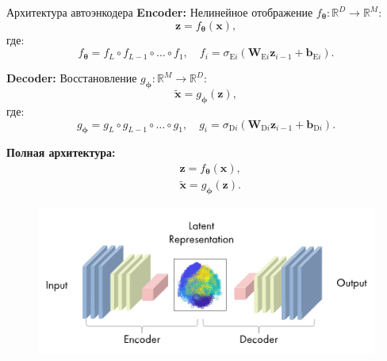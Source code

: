 \begin{frame}[allowframebreaks]{Архитектура автоэнкодера}
    \textbf{Encoder:} Нелинейное отображение $f_{\boldsymbol{\theta}}: \mathbb{R}^D \to \mathbb{R}^M$:
    \begin{equation*}
        \boldsymbol{z} = f_{\boldsymbol{\theta}}(\boldsymbol{x}),
    \end{equation*}
    где:
    \begin{equation*}
        f_{\boldsymbol{\theta}} = f_L \circ f_{L-1} \circ \ldots \circ f_1, \quad f_i = \sigma_{\text{E}i}(\mathbf{W}_{\text{E}i}\boldsymbol{z}_{i-1} + \boldsymbol{b}_{\text{E}i}).
    \end{equation*}

    \textbf{Decoder:} Восстановление $g_{\boldsymbol{\phi}}: \mathbb{R}^M \to \mathbb{R}^D$:
    \begin{equation*}
        \tilde{\boldsymbol{x}} = g_{\boldsymbol{\phi}}(\boldsymbol{z}),
    \end{equation*}
    где:
    \begin{equation*}
        g_{\boldsymbol{\phi}} = g_L \circ g_{L-1} \circ \ldots \circ g_1, \quad g_i = \sigma_{\text{D}i}(\mathbf{W}_{\text{D}i}\boldsymbol{z}_{i-1} + \boldsymbol{b}_{\text{D}i}).
    \end{equation*}

    \textbf{Полная архитектура:}
    \begin{align*}
        &\boldsymbol{z} = f_{\boldsymbol{\theta}}(\boldsymbol{x}), \\
        &\tilde{\boldsymbol{x}} = g_{\boldsymbol{\phi}}(\boldsymbol{z}).
    \end{align*}

    \begin{figure}
        \centering
        \includegraphics[width=.8\textwidth]{../resources/methods/autoencoder.png}
    \end{figure}
\end{frame}

